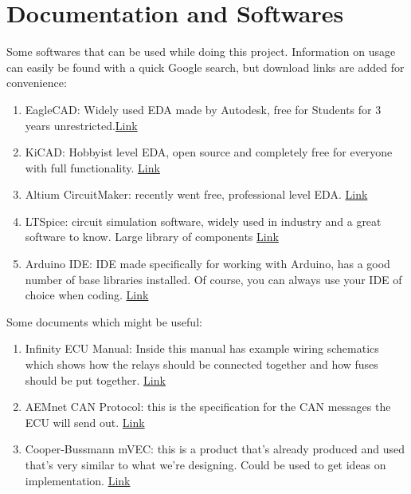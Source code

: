 \documentclass[12pt,letterpaper]{article}
\begin{document}
\section{ Documentation and Softwares }
Some softwares that can be used while doing this project. Information on usage can easily be found with a quick Google search, but download links are added for convenience:
\begin{enumerate}
    \item EagleCAD: Widely used EDA made by Autodesk, free for Students for 3 years unrestricted.\href{https://www.autodesk.com/products/eagle/overview}{Link}
    \item KiCAD: Hobbyist level EDA, open source and completely free for everyone with full functionality. \href{http://kicad-pcb.org/}{Link}
    \item Altium CircuitMaker: recently went free, professional level EDA. \href{https://circuitmaker.com/}{Link}
    \item LTSpice: circuit simulation software, widely used in industry and a great software to know. Large library of components \href{https://www.analog.com/en/design-center/design-tools-and-calculators/ltspice-simulator.html}{Link}
    \item Arduino IDE: IDE made specifically for working with Arduino, has a good number of base libraries installed. Of course, you can always use your IDE of choice when coding. \href{https://www.arduino.cc/en/Main/Software}{Link}
\end{enumerate} 

\noindent Some documents which might be useful:
\begin{enumerate}
    \item Infinity ECU Manual: Inside this manual has example wiring schematics which shows how the relays should be connected together and how fuses should be put together. \href{https://www.aemelectronics.com/files/instructions/Infinity-ECU-Full-Manual.pdf}{Link}
    \item AEMnet CAN Protocol: this is the specification for the CAN messages the ECU will send out. \href{https://www.arduino.cc/en/Main/Software}{Link}
    \item Cooper-Bussmann mVEC: this is a product that's already produced and used that's very similar to what we're designing. Could be used to get ideas on implementation. \href{http://www.cooperindustries.com/content/public/en/bussmann/transportation/products/power_distribution/vehicle_electriccentersvec/multiplexed_vehicleelectricalcenter.html}{Link}
\end{enumerate} 
\end{document}

